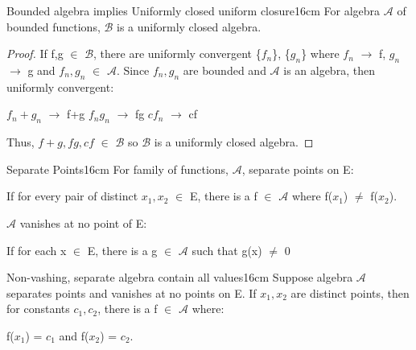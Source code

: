     \vspace{0.5cm}



    \begin{wtheorem}{Bounded algebra implies Uniformly closed uniform closure}{16cm}
        For algebra $\mathscr{A}$ of bounded functions, $\mathscr{B}$
        is a uniformly closed algebra.
    \end{wtheorem}

    \begin{proof}
        If f,g $\in$ $\mathscr{B}$, there are uniformly convergent \{$f_n$\},
        \{$g_n$\} where $f_n$ $\rightarrow$ f, $g_n$ $\rightarrow$ g
        and $f_n,g_n$ $\in$ $\mathscr{A}$.
        Since $f_n,g_n$ are bounded and $\mathscr{A}$ is an algebra, then
        uniformly convergent:

        \hspace{0.5cm}
        $f_n + g_n$ $\rightarrow$ f+g
        \hspace{0.5cm}
        $f_ng_n$ $\rightarrow$ fg
        \hspace{0.5cm}
        $cf_n$ $\rightarrow$ cf

        Thus, $f+g, fg, cf$ $\in$ $\mathscr{B}$ so $\mathscr{B}$
        is a uniformly closed algebra.
    \end{proof}

    \newpage



    \begin{definition}{Separate Points}{16cm}
        For family of functions, $\mathscr{A}$, {\color{lblue} separate points} on E:

        \hspace{0.5cm}
        If for every pair of distinct $x_1,x_2$ $\in$ E, there
        is a f $\in$ $\mathscr{A}$ where f($x_1$) $\not =$ f($x_2$).

        \vspace{0.3cm}

        $\mathscr{A}$ {\color{lblue} vanishes at no point} of E:

        \hspace{0.5cm}
        If for each x $\in$ E, there is a g $\in$ $\mathscr{A}$
        such that g(x) $\not =$ 0
    \end{definition}

    \vspace{0.5cm}




    \begin{wtheorem}{Non-vashing, separate algebra contain all values}{16cm}
        Suppose algebra $\mathscr{A}$ separates points and vanishes
        at no points on E. If $x_1,x_2$ are distinct points, then for
        constants $c_1,c_2$, there is a f $\in$ $\mathscr{A}$ where:

        \hspace{0.5cm}
        f($x_1$) = $c_1$ and f($x_2$) = $c_2$.
    \end{wtheorem}

